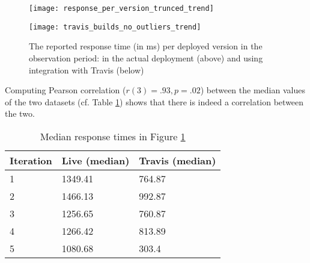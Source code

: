       \begin{figure}[h!]
        \centering
        \texttt{[image: response\_per\_version\_trunced\_trend]}


        \advance\leftskip-0.2cm
        \texttt{[image: travis\_builds\_no\_outliers\_trend]}
        \caption{The reported response time (in ms) per deployed version in the observation period: 
        in the actual deployment (above) and using integration with Travis (below)}        
        
        \label{fig:response_times_preemptive}
      \end{figure}

  Computing Pearson correlation ($r(3)=.93, p=.02$) between the median values of the two datasets (cf. Table \ref{tab:correlations}) shows that there is indeed a correlation between the two.


    \begin{table}[h]
      
      \centering
      \begin{tabular}{lll}
        \toprule
        Iteration & \bfseries Live (median) & \bfseries Travis (median)\\
        \midrule
        1 & 1349.41 & 764.87\\ 
        2 & 1466.13 & 992.87\\
        3 & 1256.65 & 760.87\\
        4 & 1266.42 & 813.89\\
        5 & 1080.68 & 303.4\\
        \bottomrule
      
      \end{tabular}
      \caption{Median response times in Figure \ref{fig:response_times_preemptive}}
      \label{tab:correlations}
    \end{table}





